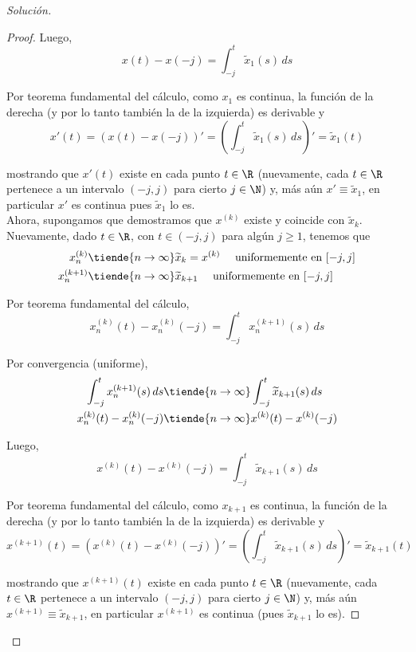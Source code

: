 \documentclass[duedate = 11 de Septiembre, 
			ramo = An\'alisis Funcional, 
			doctype = Tarea 1,
			semester = 2,
			year = 2017]{tarea}
\begin{document}
\begin{proof}[Solución]
\begin{afirmacion}
\begin{proof}
		Luego,
			$$x(t) - x(-j) = \int_{-j}^{t} \widetilde{x}_{1}(s) \, ds $$
		
		Por teorema fundamental del cálculo, como $x_{1}$ es continua, la función de la derecha (y por lo tanto también la de la izquierda) es derivable y
			$$x'(t) = (x(t) - x(-j))' = \left(\int_{-j}^{t} \widetilde{x}_{1}(s) \, ds\right)' = \widetilde{x}_{1}(t) $$ 
		
		mostrando que $x'(t)$ existe en cada punto $t \in \R$ (nuevamente, cada $t \in \R$ pertenece a un intervalo $(-j,j)$ para cierto $j \in \N$) y, más aún $x' \equiv \widetilde{x}_{1}$, en particular $x'$ es continua pues $\widetilde{x}_{1}$ lo es.	\\
		
		Ahora, supongamos que demostramos que $x^{(k)}$ existe y coincide con $\widetilde{x}_{k}$. Nuevamente, dado $t \in \R$, con $t \in (-j,j)$ para algún $j \geq 1$, tenemos que
			\begin{align*}
				x^{(k)}_{n}		&\tiende{n \to \infty} \widetilde{x}_{k} = x^{(k)}	\quad	\text{ uniformemente en } [-j,j]	\\
				x^{(k+1)}_{n}	&\tiende{n \to \infty} \widetilde{x}_{k+1}		\quad	\text{ uniformemente en } [-j,j]
			\end{align*}

		Por teorema fundamental del cálculo,
			$$x^{(k)}_{n}(t) - x^{(k)}_{n}(-j) = \int_{-j}^{t} x^{(k+1)}_{n}(s) \, ds$$
		
		Por convergencia (uniforme),
			\begin{align*}
				\int_{-j}^{t} x^{(k+1)}_{n}(s) \, ds 
					&\tiende{n \to \infty}	\int_{-j}^{t} \widetilde{x}_{k+1}(s) \, ds	\\
				x^{(k)}_{n}(t) - x^{(k)}_{n}(-j)
					&\tiende{n \to \infty}	x^{(k)}(t) - x^{(k)}(-j)
			\end{align*}

		Luego,
			$$x^{(k)}(t) - x^{(k)}(-j) = \int_{-j}^{t} \widetilde{x}_{k+1}(s) \, ds $$

\newpage		
		Por teorema fundamental del cálculo, como $x_{k+1}$ es continua, la función de la derecha (y por lo tanto también la de la izquierda) es derivable y
			$$x^{(k+1)}(t) = (x^{(k)}(t) - x^{(k)}(-j))' = \left(\int_{-j}^{t} \widetilde{x}_{k+1}(s) \, ds\right)' = \widetilde{x}_{k+1}(t) $$ 

		mostrando que $x^{(k+1)}(t)$ existe en cada punto $t \in \R$ (nuevamente, cada $t \in \R$ pertenece a un intervalo $(-j,j)$ para cierto $j \in \N$) y, más aún $x^{(k+1)} \equiv \widetilde{x}_{k+1}$, en particular $x^{(k+1)}$ es continua (pues $\widetilde{x}_{k+1}$ lo es).
		\end{proof}


\end{afirmacion}
\end{proof}
\end{document}
